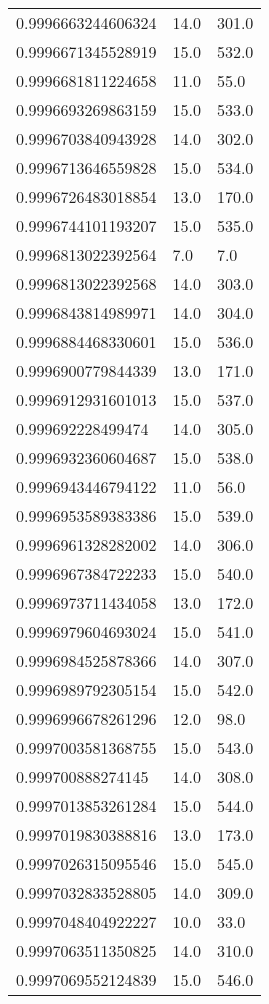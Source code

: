 \begin{center}
\begin{supertabular}[H]{p{0.30\textwidth}p{0.05\textwidth}p{0.05\textwidth}}
0.9996663244606324 & 14.0 & 301.0 \\ 
0.9996671345528919 & 15.0 & 532.0 \\ 
0.9996681811224658 & 11.0 & 55.0 \\ 
0.9996693269863159 & 15.0 & 533.0 \\ 
0.9996703840943928 & 14.0 & 302.0 \\ 
0.9996713646559828 & 15.0 & 534.0 \\ 
0.9996726483018854 & 13.0 & 170.0 \\ 
0.9996744101193207 & 15.0 & 535.0 \\ 
0.9996813022392564 & 7.0 & 7.0 \\ 
0.9996813022392568 & 14.0 & 303.0 \\ 
0.9996843814989971 & 14.0 & 304.0 \\ 
0.9996884468330601 & 15.0 & 536.0 \\ 
0.9996900779844339 & 13.0 & 171.0 \\ 
0.9996912931601013 & 15.0 & 537.0 \\ 
0.999692228499474 & 14.0 & 305.0 \\ 
0.9996932360604687 & 15.0 & 538.0 \\ 
0.9996943446794122 & 11.0 & 56.0 \\ 
0.9996953589383386 & 15.0 & 539.0 \\ 
0.9996961328282002 & 14.0 & 306.0 \\ 
0.9996967384722233 & 15.0 & 540.0 \\ 
0.9996973711434058 & 13.0 & 172.0 \\ 
0.9996979604693024 & 15.0 & 541.0 \\ 
0.9996984525878366 & 14.0 & 307.0 \\ 
0.9996989792305154 & 15.0 & 542.0 \\ 
0.9996996678261296 & 12.0 & 98.0 \\ 
0.9997003581368755 & 15.0 & 543.0 \\ 
0.999700888274145 & 14.0 & 308.0 \\ 
0.9997013853261284 & 15.0 & 544.0 \\ 
0.9997019830388816 & 13.0 & 173.0 \\ 
0.9997026315095546 & 15.0 & 545.0 \\ 
0.9997032833528805 & 14.0 & 309.0 \\ 
0.9997048404922227 & 10.0 & 33.0 \\ 
0.9997063511350825 & 14.0 & 310.0 \\ 
0.9997069552124839 & 15.0 & 546.0 \\ 

\end{supertabular}
\end{center}
